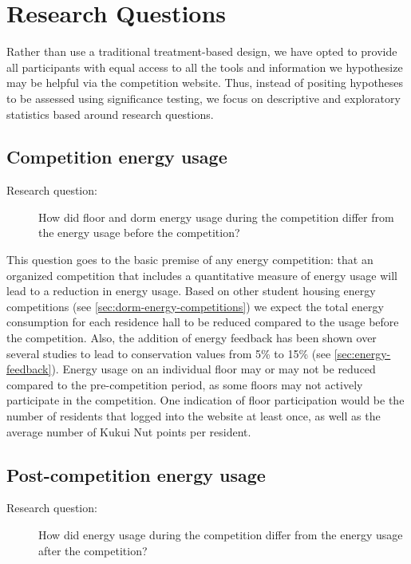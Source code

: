 \section{Research Questions}

Rather than use a traditional treatment-based design, we have opted to provide all participants with equal access to all the tools and information we hypothesize may be helpful via the competition website. Thus, instead of positing hypotheses to be assessed using significance testing, we focus on descriptive and exploratory statistics based around research questions.

\subsection{Competition energy usage}
\label{sec:competition-energy}

\begin{description}
\item[Research question:] How did floor and dorm energy usage during the competition differ from the energy usage before the competition?
\end{description}

This question goes to the basic premise of any energy competition: that an organized competition that includes a quantitative measure of energy usage will lead to a reduction in energy usage. Based on other student housing energy competitions (see \autoref{sec:dorm-energy-competitions}) we expect the total energy consumption for each residence hall to be reduced compared to the usage before the competition. Also, the addition of energy feedback has been shown over several studies to lead to conservation values from 5\% to 15\% (see \autoref{sec:energy-feedback}). Energy usage on an individual floor may or may not be reduced compared to the pre-competition period, as some floors may not actively participate in the competition. One indication of floor participation would be the number of residents that logged into the website at least once, as well as the average number of Kukui Nut points per resident.

\subsection{Post-competition energy usage}
\label{sec:post-competition-energy}

\begin{description}
\item[Research question:] How did energy usage during the competition differ from the energy usage after the competition?
\end{description}

